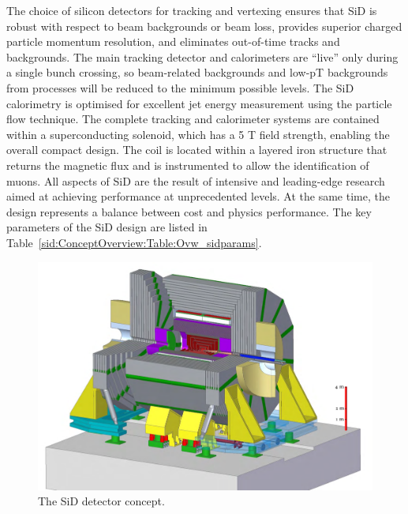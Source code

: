 The choice of silicon detectors for tracking and vertexing ensures that SiD is robust
with respect to beam backgrounds or beam loss, provides superior charged particle momentum
resolution, and eliminates out-of-time tracks and backgrounds. The main tracking
detector and calorimeters are “live” only during a single bunch crossing, so beam-related
backgrounds and low-pT backgrounds from \gamgam processes will be reduced to the minimum
possible levels. The SiD calorimetry is optimised for excellent jet energy measurement
using the particle flow technique. The complete tracking and calorimeter systems are contained
within a superconducting solenoid, which has a 5 T field strength, enabling the overall
compact design. The coil is located within a layered iron structure that returns the magnetic flux and is instrumented to allow the identification of muons. All aspects of SiD are the result of intensive and leading-edge research aimed at achieving
performance at unprecedented levels. At the same time, the design represents a balance between cost
and physics performance. The key parameters of the SiD design are listed in  Table~\ref{sid:ConceptOverview:Table:Ovw_sidparams}.

\begin{figure}[tb]
 \begin{center}
 \includegraphics[width=0.9\hsize]{chapters/figures/SiD.pdf}
\caption{The SiD detector concept.
\label{fig_sid}}
 \end{center}
 \vspace{-0.7cm}
 \end{figure}

